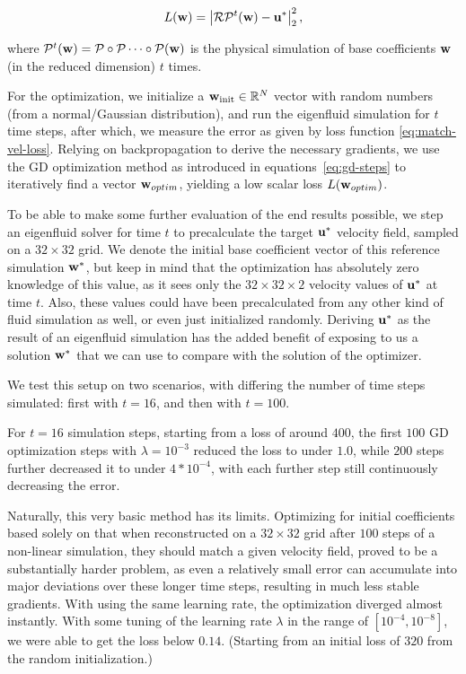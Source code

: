 \begin{equation}\label{eq:match-vel-loss}
  L(\vb{w}) = \left|
  \mathcal{R}\mathcal{P}^{t}(\vb{w}) - \vb{u}^*
  \right|_2^2,
\end{equation}

where $\mathcal{P}^t(\vb{w}) = \mathcal{P} \circ \mathcal{P} \dots \circ
\mathcal{P}(\vb{w})$ is the physical simulation of base coefficients $\vb{w}$
(in the reduced dimension) $t$ times.

For the optimization, we initialize a $\vb{w}_\text{init} \in \mathbb{R}^N$
vector with random numbers (from a normal/Gaussian distribution), and run the
eigenfluid simulation for $t$ time steps, after which, we measure the error as
given by loss function \eqref{eq:match-vel-loss}. Relying on backpropagation to
derive the necessary gradients, we use the \ac{GD} optimization method as
introduced in equations~\eqref{eq:gd-steps} to iteratively find a vector
$\vb{w}_{optim}$, yielding a low scalar loss $L(\vb{w}_{optim})$.

To be able to make some further evaluation of the end results possible, we step
an eigenfluid solver for time $t$ to precalculate the target $\vb{u}^*$ velocity
field, sampled on a $32\times32$ grid. We denote the initial base coefficient
vector of this reference simulation $\vb{w}^*$, but keep in mind that the
optimization has absolutely zero knowledge of this value, as it sees only the
$32\times32\times2$ velocity values of $\vb{u}^*$ at time $t$. Also, these
values could have been precalculated from any other kind of fluid simulation as
well, or even just initialized randomly. Deriving $\vb{u}^*$ as the result of an
eigenfluid simulation has the added benefit of exposing to us a solution
$\vb{w}^*$ that we can use to compare with the solution of the optimizer.

We test this setup on two scenarios, with differing the number of time steps
simulated: first with $t=16$, and then with $t=100$.

For $t=16$ simulation steps, starting from a loss of around $400$, the first
$100$ \ac{GD} optimization steps with $\lambda=10^{-3}$ reduced the loss to
under $1.0$, while $200$ steps further decreased it to under $4*10^{-4}$, with
each further step still continuously decreasing the error. 

Naturally, this very basic method has its limits.  Optimizing for initial
coefficients based solely on that when reconstructed on a $32\times32$ grid
after $100$ steps of a non-linear simulation, they should match a given velocity
field, proved to be a substantially harder problem, as even a relatively small
error can accumulate into major deviations over these longer time steps,
resulting in much less stable gradients. With using the same learning rate, the
optimization diverged almost instantly. With some tuning of the learning rate
$\lambda$ in the range of $[10^{-4}, 10^{-8}]$, we were able to get the loss
below $0.14$.  (Starting from an initial loss of $320$ from the random
initialization.) 

